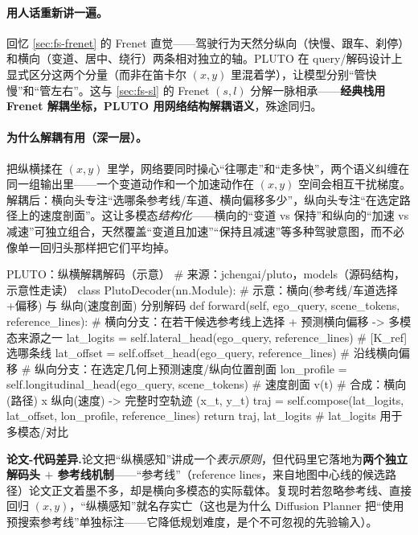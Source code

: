 \paragraph{用人话重新讲一遍。}
回忆 \cref{sec:fs-frenet} 的 Frenet 直觉——驾驶行为天然分纵向（快慢、跟车、刹停）和横向（变道、居中、绕行）两条相对独立的轴。PLUTO 在 query/解码设计上显式区分这两个分量（而非在笛卡尔 $(x,y)$ 里混着学），让模型分别“管快慢”和“管左右”。这与 \cref{sec:fs-sl} 的 Frenet $(s,l)$ 分解一脉相承——\textbf{经典栈用 Frenet 解耦坐标，PLUTO 用网络结构解耦语义}，殊途同归。

\paragraph{为什么解耦有用（深一层）。}
把纵横揉在 $(x,y)$ 里学，网络要同时操心“往哪走”和“走多快”，两个语义纠缠在同一组输出里——一个变道动作和一个加速动作在 $(x,y)$ 空间会相互干扰梯度。解耦后：横向头专注“选哪条参考线/车道、横向偏移多少”，纵向头专注“在选定路径上的速度剖面”。这让多模态\emph{结构化}——横向的“变道 vs 保持”和纵向的“加速 vs 减速”可独立组合，天然覆盖“变道且加速”“保持且减速”等多种驾驶意图，而不必像单一回归头那样把它们平均掉。

\begin{codebox}[Python]{PLUTO：纵横解耦解码（示意）}
# 来源：jchengai/pluto，models（源码结构，示意性走读）
class PlutoDecoder(nn.Module):  # 示意：横向(参考线/车道选择+偏移) 与 纵向(速度剖面) 分别解码
    def forward(self, ego_query, scene_tokens, reference_lines):
        # 横向分支：在若干候选参考线上选择 + 预测横向偏移 -> 多模态来源之一
        lat_logits = self.lateral_head(ego_query, reference_lines)   # [K_ref] 选哪条线
        lat_offset = self.offset_head(ego_query, reference_lines)    # 沿线横向偏移
        # 纵向分支：在选定几何上预测速度/纵向位置剖面
        lon_profile = self.longitudinal_head(ego_query, scene_tokens)  # 速度剖面 v(t)
        # 合成：横向(路径) x 纵向(速度) -> 完整时空轨迹 (x_t, y_t)
        traj = self.compose(lat_logits, lat_offset, lon_profile, reference_lines)
        return traj, lat_logits     # lat_logits 用于多模态/对比
\end{codebox}

\begin{note}
\textbf{论文-代码差异.}\;论文把“纵横感知”讲成一个\emph{表示原则}，但代码里它落地为\textbf{两个独立解码头 $+$ 参考线机制}——“参考线”（reference lines，来自地图中心线的候选路径）论文正文着墨不多，却是横向多模态的实际载体。复现时若忽略参考线、直接回归 $(x,y)$，“纵横感知”就名存实亡（这也是为什么 Diffusion Planner 把“使用预搜索参考线”单独标注——它降低规划难度，是个不可忽视的先验输入）。
\end{note}

